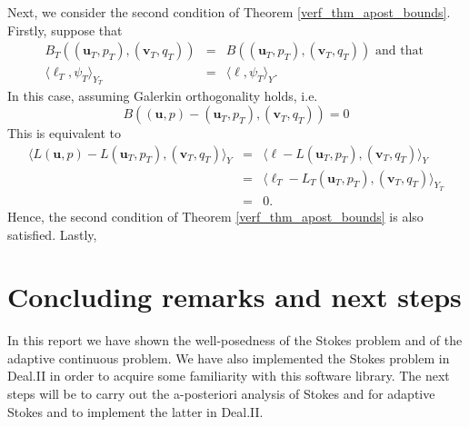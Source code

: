 \documentclass[12pt,a4paper]{article}
\theoremstyle{definition}
\begin{document}
Next, we consider the second condition of Theorem \ref{verf_thm_apost_bounds}.  Firstly, suppose that
\begin{eqnarray}
B_T\left(\left(\textbf{u}_T,p_T\right),\left(\textbf{v}_T,q_T\right)\right)&=&B\left(\left(\textbf{u}_T,p_T\right),\left(\textbf{v}_T,q_T\right)\right)\text{ and that }\\
\langle \ell_T,\psi_T \rangle_{Y_T}&=&\langle \ell,\psi_T \rangle_{Y}.
\end{eqnarray}
In this case, assuming Galerkin orthogonality holds, i.e.
\begin{equation}
B\left(\left(\textbf{u},p\right)-\left(\textbf{u}_T,p_T\right),\left(\textbf{v}_T,q_T\right)\right) = 0
\end{equation} 
This is equivalent to 
\begin{eqnarray}
\langle L\left(\textbf{u},p\right)-L\left(\textbf{u}_T,p_T\right),\left(\textbf{v}_T,q_T\right)\rangle_Y&=&\langle \ell - L\left(\textbf{u}_T,p_T\right),\left(\textbf{v}_T,q_T\right) \rangle_Y\nonumber\\
&=&\langle \ell_T - L_T\left(\textbf{u}_T,p_T\right),\left(\textbf{v}_T,q_T\right) \rangle_{Y_T}\nonumber\\
&=&0.\nonumber
\end{eqnarray}
Hence, the second condition of Theorem \ref{verf_thm_apost_bounds} is also satisfied.  Lastly,
\section{Concluding remarks and next steps}\label{sec_conclusion}
In this report we have shown the well-posedness of the Stokes problem and of the adaptive continuous problem.  We have also implemented the Stokes problem in Deal.II in order to acquire some familiarity with this software library.  The next steps will be to carry out the a-posteriori analysis of Stokes and for adaptive Stokes and to implement the latter  in Deal.II.  



\end{document}
